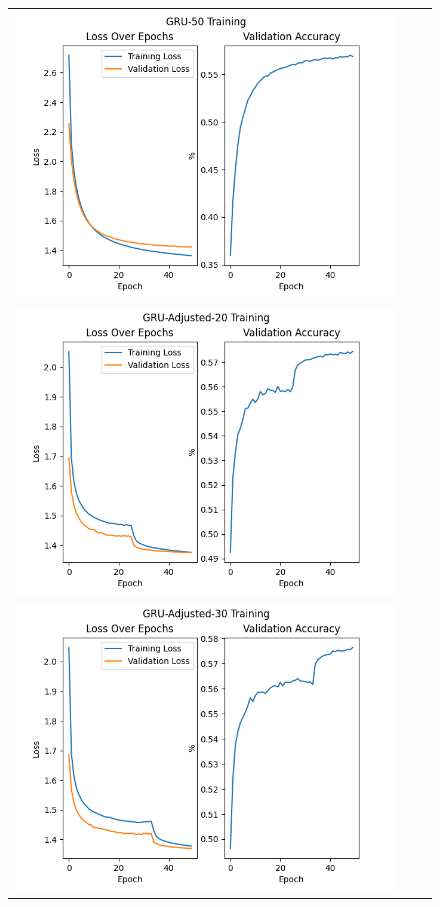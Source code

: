 \documentclass{article}
\begin{document}
\begin{enumerate}[label=1\alph*. ]
\begin{figure}[htb]
\begin{tabularx}{\textwidth}{XXX}
          \includegraphics{images/GRU-50_training_new.png}   \\
          \includegraphics{images/GRU-Adjusted-20_training_new.png} \\
          \includegraphics{images/GRU-Adjusted-30_training_new.png} \\

\end{tabularx}
\end{figure}
\end{enumerate}
\end{document}
